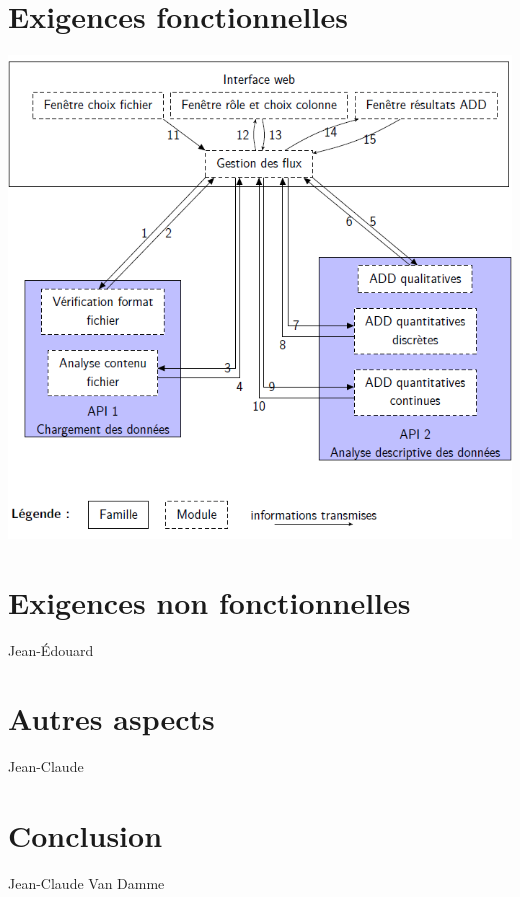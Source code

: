 	\section{Exigences fonctionnelles}
	\begin{frame}
		\begin{center}\includegraphics[scale=0.43]{org.png}\end{center}
	\end{frame}
	
	\section{Exigences non fonctionnelles}
	\begin{frame}
		Jean-Édouard
	\end{frame}
	
	\section{Autres aspects}
	\begin{frame}
		Jean-Claude
	\end{frame}
	
	\section{Conclusion}
	\begin{frame}
		Jean-Claude Van Damme
	\end{frame}
	

